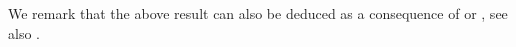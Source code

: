\documentclass[
	fontsize=11pt, 
	twoside=false, 
	abstract=true, 
	a4paper,
]{scrartcl}
\newcommand{\abs}[1]{\left\lvert#1\right\rvert}
\newcommand{\del}{\partial}
\begin{document}
We remark that the above result can also be deduced as a consequence of \cite[Lem.~8.6.3]{hoermander1} or \cite[Prop.~1.5.4]{zbMATH04105482}, see also \cite[Lem.~3.1]{zbMATH064747055}.

\end{document}

